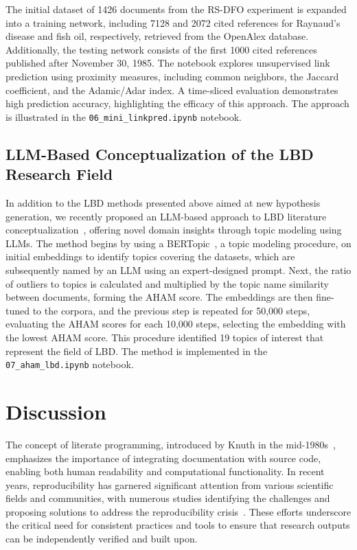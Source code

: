 \documentclass[runningheads]{llncs}
\begin{document}
The initial dataset of 1426 documents from the RS-DFO experiment is expanded into a training network, including 7128 and 2072 cited references for Raynaud's disease and fish oil, respectively, retrieved from the OpenAlex database. Additionally, the testing network consists of the first 1000 cited references published after November 30, 1985. The notebook explores unsupervised link prediction using proximity measures, including common neighbors, the Jaccard coefficient, and the Adamic/Adar index. A time-sliced evaluation demonstrates high prediction accuracy, highlighting the efficacy of this approach. The approach is illustrated in the \texttt{06\_mini\_linkpred.ipynb} notebook.

\subsection{LLM-Based Conceptualization of the LBD Research Field}
\label{sec:aham}

In addition to the LBD methods presented above aimed at new hypothesis generation, we recently proposed an LLM-based approach to LBD literature conceptualization~\cite{koloski2024aham}, offering novel domain insights through topic modeling using LLMs. The method begins by using a BERTopic~\cite{grootendorst2022bertopic}, a topic modeling procedure, on initial embeddings to identify topics covering the datasets, which are subsequently named by an LLM using an expert-designed prompt. Next, the ratio of outliers to topics is calculated and multiplied by the topic name similarity between documents, forming the AHAM score. The embeddings are then fine-tuned to the corpora, and the previous step is repeated for {50,000} steps, evaluating the AHAM scores for each {10,000} steps, selecting the embedding with the lowest AHAM score. This procedure identified 19 topics of interest that represent the field of LBD. The method is implemented in the \texttt{07\_aham\_lbd.ipynb} notebook.

\section{Discussion}
\label{sec:discussion}

The concept of literate programming, introduced by Knuth in the mid-1980s~\cite{knuth1984literate}, emphasizes the importance of integrating documentation with source code, enabling both human readability and computational functionality. In recent years, reproducibility has garnered significant attention from various scientific fields and communities, with numerous studies identifying the challenges and proposing solutions to address the reproducibility crisis~\cite{baker2016scientists}. These efforts underscore the critical need for consistent practices and tools to ensure that research outputs can be independently verified and built upon.
\end{document}
